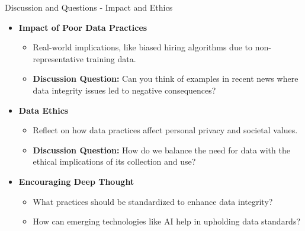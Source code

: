 \documentclass[aspectratio=169]{beamer}
\begin{document}
\begin{frame}[fragile]{Discussion and Questions - Impact and Ethics}
    \begin{itemize}
        \item \textbf{Impact of Poor Data Practices}
            \begin{itemize}
                \item Real-world implications, like biased hiring algorithms due to non-representative training data.
                \item \textbf{Discussion Question:} Can you think of examples in recent news where data integrity issues led to negative consequences?
            \end{itemize}
        
        \item \textbf{Data Ethics}
            \begin{itemize}
                \item Reflect on how data practices affect personal privacy and societal values.
                \item \textbf{Discussion Question:} How do we balance the need for data with the ethical implications of its collection and use?
            \end{itemize}
        
        \item \textbf{Encouraging Deep Thought}
            \begin{itemize}
                \item What practices should be standardized to enhance data integrity?
                \item How can emerging technologies like AI help in upholding data standards?
            \end{itemize}
    \end{itemize}
\end{frame}
\end{document}
